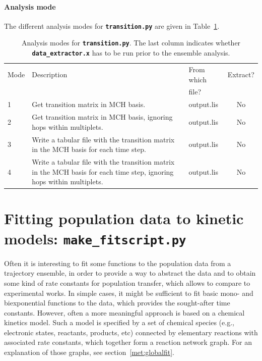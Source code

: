 \documentclass[a4paper,10pt,DIV=15,openany,twoside=false]{scrbook}
\newcommand{\ttt}[1]{\textbf{\texttt{#1}}}
\begin{document}
\paragraph{Analysis mode}

The different analysis modes for \ttt{transition.py} are given in Table~\ref{tab:Transition_modes}.

\begin{table}
  \centering
  \caption{Analysis modes for \ttt{transition.py}. The last column indicates whether \ttt{data\_extractor.x} has to be run prior to the ensemble analysis.}
  \label{tab:Transition_modes}
  \begin{tabular}{lp{8cm}>{\ttfamily}lc}
    \toprule
    Mode        &Description    &\rmfamily From which     &Extract?\\
                               &&\rmfamily file?          &\\
    \midrule
    1   &Get transition matrix in MCH basis. &output.lis  &No\\
    2   &Get transition matrix in MCH basis, ignoring hops within multiplets. &output.lis  &No\\
    3   &Write a tabular file with the transition matrix in the MCH basis for each time step. &output.lis  &No\\
    4   &Write a tabular file with the transition matrix in the MCH basis for each time step, ignoring hops within multiplets.   &output.lis &No\\
    \bottomrule
  \end{tabular}
\end{table}







\section{Fitting population data to kinetic models: \ttt{make\_fitscript.py}}\label{sec:make_fitscript.py}

Often it is interesting to fit some functions to the population data from a trajectory ensemble, in order to provide a way to abstract the data and to obtain some kind of rate constants for population transfer, which allows to compare to experimental works.
In simple cases, it might be sufficient to fit basic mono- and biexponential functions to the data, which provides the sought-after time constants.
However, often a more meaningful approach is based on a chemical kinetics model.
Such a model is specified by a set of chemical species (e.g., electronic states, reactants, products, etc) connected by elementary reactions with associated rate constants, which together form a reaction network graph.
For an explanation of those graphs, see section~\ref{met:globalfit}.
\end{document}
